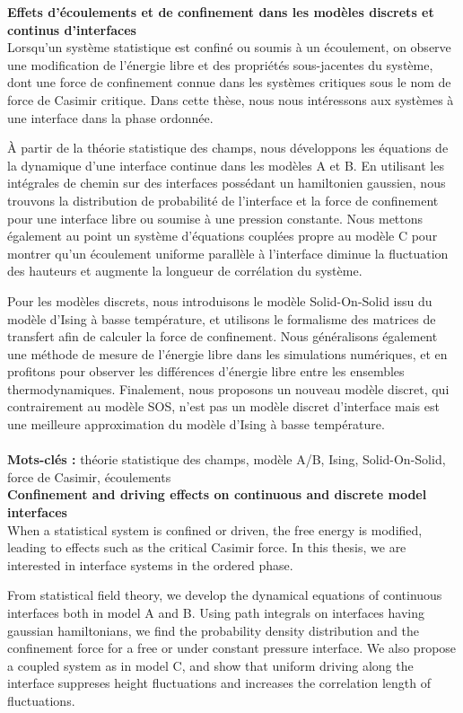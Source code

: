 {\bf Effets d'écoulements et de confinement dans les modèles discrets et continus d'interfaces} \\

Lorsqu'un système statistique est confiné ou soumis à un écoulement, on observe une modification de l'énergie libre et des propriétés sous-jacentes du système, dont une force de confinement connue dans les systèmes critiques sous le nom de force de Casimir critique. Dans cette thèse, nous nous intéressons aux systèmes à une interface dans la phase ordonnée. 

À partir de la théorie statistique des champs, nous développons les équations de la dynamique d'une interface continue dans les modèles A et B. En utilisant les intégrales de chemin sur des interfaces possédant un hamiltonien gaussien, nous trouvons la distribution de probabilité de l'interface et la force de confinement pour une interface libre ou soumise à une pression constante. Nous mettons également au point un système d'équations couplées propre au modèle C pour montrer qu'un écoulement uniforme parallèle à l'interface diminue la fluctuation des hauteurs et augmente la longueur de corrélation du système.

Pour les modèles discrets, nous introduisons le modèle Solid-On-Solid issu du modèle d'Ising à basse température, et utilisons le formalisme des matrices de transfert afin de calculer la force de confinement. Nous généralisons également une méthode de mesure de l'énergie libre dans les simulations numériques, et en profitons pour observer les différences d'énergie libre entre les ensembles thermodynamiques. Finalement, nous proposons un nouveau modèle discret, qui contrairement au modèle SOS, n'est pas un modèle discret d'interface mais est une meilleure approximation du modèle d'Ising à basse température.
\\ \\
{\bf Mots-clés :} théorie statistique des champs, modèle A/B, Ising, Solid-On-Solid, force de Casimir, écoulements \\

{\bf Confinement and driving effects on continuous and discrete model interfaces}\\

When a statistical system is confined or driven, the free energy is modified, leading to effects such as the critical Casimir force. In this thesis, we are interested in interface systems in the ordered phase.

From statistical field theory, we develop the dynamical equations of continuous interfaces both in model A and B. Using path integrals on interfaces having gaussian hamiltonians, we find the probability density distribution and the confinement force for a free or under constant pressure interface. We also propose a coupled system as in model C, and show that uniform driving along the interface suppreses height fluctuations and increases the correlation length of fluctuations. 

